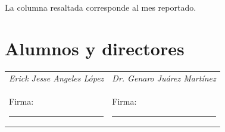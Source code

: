 \documentclass[letterpaper,10pt,oneside]{article}
\begin{document}
	\vspace{0.5em}
	{\small La columna resaltada corresponde al mes reportado.}

	\section{Alumnos y directores}

	\vspace{1em}
	\begin{tabular}{@{} p{} p{} @{}}
		\textit{Erick Jesse Angeles López} & \textit{Dr. Genaro Juárez Martínez} \\[5em]
		Firma: \rule{6cm}{0.4pt} & Firma: \rule{6cm}{0.4pt} \\
	\end{tabular}
\end{document}
